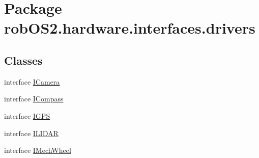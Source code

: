 \hypertarget{namespacerob_o_s2_1_1hardware_1_1interfaces_1_1drivers}{
\section{Package robOS2.hardware.interfaces.drivers}
\label{namespacerob_o_s2_1_1hardware_1_1interfaces_1_1drivers}
}
\subsection*{Classes}
\begin{DoxyCompactItemize}
\item 
interface \hyperlink{interfacerob_o_s2_1_1hardware_1_1interfaces_1_1drivers_1_1_i_camera}{ICamera}
\item 
interface \hyperlink{interfacerob_o_s2_1_1hardware_1_1interfaces_1_1drivers_1_1_i_compass}{ICompass}
\item 
interface \hyperlink{interfacerob_o_s2_1_1hardware_1_1interfaces_1_1drivers_1_1_i_g_p_s}{IGPS}
\item 
interface \hyperlink{interfacerob_o_s2_1_1hardware_1_1interfaces_1_1drivers_1_1_i_l_i_d_a_r}{ILIDAR}
\item 
interface \hyperlink{interfacerob_o_s2_1_1hardware_1_1interfaces_1_1drivers_1_1_i_mech_wheel}{IMechWheel}
\end{DoxyCompactItemize}
